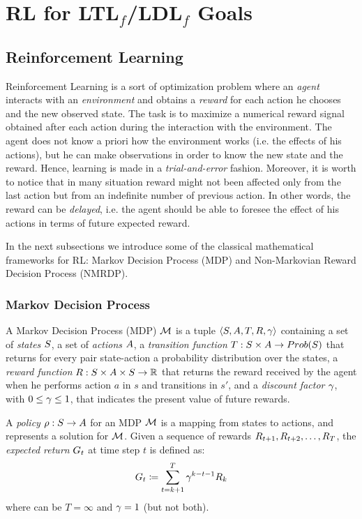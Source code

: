 \chapter{RL for {\sc LTL}$_f$/{\sc LDL}$_f$ Goals}

\section{Reinforcement Learning}
\label{RL}
Reinforcement Learning \citep{Sutton:1998:IRL:551283} is a sort of optimization problem where an \emph{agent} interacts with an \emph{environment} and obtains a \emph{reward} for each action he chooses and the new observed state. The task is to maximize a numerical reward signal obtained after each action during the interaction with the environment. The agent does not know a priori how the environment works (i.e. the effects of his actions), but he can make observations in order to know the new state and the reward. Hence, learning is made in a \emph{trial-and-error} fashion. Moreover, it is worth to notice that in many situation reward might not been affected only from the last action but from an indefinite number of previous action. In other words, the reward can be \emph{delayed}, i.e. the agent should be able to foresee the effect of his actions in terms of future expected reward. 

In the next subsections we introduce some of the classical mathematical frameworks for RL: Markov Decision Process (MDP) and Non-Markovian Reward Decision Process (NMRDP).
\subsection{Markov Decision Process}
\label{MDP}

A Markov Decision Process (MDP) $\mathcal{M}$ is a tuple $\langle S, A, T, R, \gamma \rangle$ containing a set of \emph{states} $S$, a set of \emph{actions} $A$, a \emph{transition function} $T: S \times A \to Prob(S)$ that returns for every pair state-action a probability distribution over the states, a \emph{reward function} $R: S \times A \times S \to \mathbb{R}$ that returns the reward received by the agent when he performs action $a$ in $s$ and transitions in $s'$, and a \emph{discount factor} $\gamma$, with $0 \le \gamma \le 1$, that indicates the present value of future rewards.

A \emph{policy} $\rho: S \to A$ for an MDP $\mathcal{M}$ is a mapping from states to actions, and represents a solution for $\mathcal{M}$. Given a sequence of rewards $R_{t+1}, R_{t+2}, \dots, R_{T}$, the \emph{expected return} $G_t$ at time step $t$
is defined as: 
\begin{equation}
G_t \coloneqq \sum_{t=k+1}^T \gamma^{k-t-1}R_k
\end{equation} where can be $T = \infty$ and $\gamma = 1$ (but not both). 

